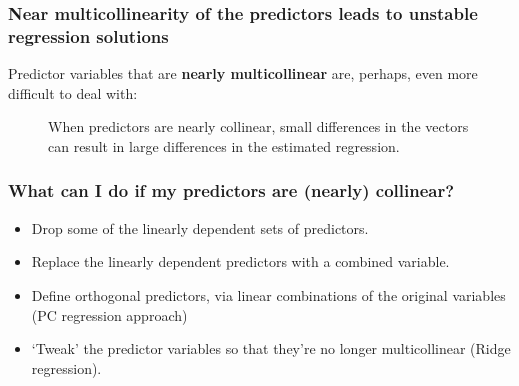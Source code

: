 \documentclass{beamer}
\begin{document}

\begin{frame}
  \frametitle{Near multicollinearity of the predictors leads to unstable regression solutions}

Predictor variables that are \textbf{nearly multicollinear} are, perhaps, even more difficult to deal with:  

\begin{figure}
\begin{center}
\end{center}
\caption{When predictors are nearly collinear, small differences in the vectors can result in large differences in the estimated regression.}
\end{figure}

\end{frame}




\begin{frame}
  \frametitle{What can I do if my predictors are (nearly) collinear?}

\begin{itemize}
    \item Drop some of the linearly dependent sets of predictors.
    \item Replace the linearly dependent predictors with a combined variable.
    \item Define orthogonal predictors, via linear combinations of the original variables (PC regression approach)
    \item `Tweak' the predictor variables so that they're no longer multicollinear (Ridge regression).
\end{itemize}

\end{frame}
\end{document}
